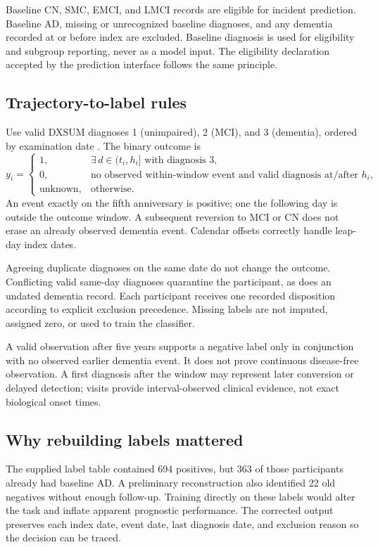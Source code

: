 \documentclass[11pt,a4paper]{article}
\begin{document}
Baseline CN, SMC, EMCI, and LMCI records are eligible for incident prediction. Baseline AD, missing or unrecognized baseline diagnoses, and any dementia recorded at or before index are excluded. Baseline diagnosis is used for eligibility and subgroup reporting, never as a model input. The eligibility declaration accepted by the prediction interface follows the same principle.
\subsection{Trajectory-to-label rules}
Use valid DXSUM diagnoses 1 (unimpaired), 2 (MCI), and 3 (dementia), ordered by examination date \cite{adni}. The binary outcome is
\begin{equation}
y_i=\begin{cases}
1, & \exists\,d\in(t_i,h_i]\text{ with diagnosis }3,\\
0, & \text{no observed within-window event and valid diagnosis at/after }h_i,\\
\mathrm{unknown}, & \text{otherwise.}
\end{cases}
\end{equation}
An event exactly on the fifth anniversary is positive; one the following day is outside the outcome window. A subsequent reversion to MCI or CN does not erase an already observed dementia event. Calendar offsets correctly handle leap-day index dates.

Agreeing duplicate diagnoses on the same date do not change the outcome. Conflicting valid same-day diagnoses quarantine the participant, as does an undated dementia record. Each participant receives one recorded disposition according to explicit exclusion precedence. Missing labels are not imputed, assigned zero, or used to train the classifier.

A valid observation after five years supports a negative label only in conjunction with no observed earlier dementia event. It does not prove continuous disease-free observation. A first diagnosis after the window may represent later conversion or delayed detection; visits provide interval-observed clinical evidence, not exact biological onset times.
\subsection{Why rebuilding labels mattered}
The supplied label table contained 694 positives, but 363 of those participants already had baseline AD. A preliminary reconstruction also identified 22 old negatives without enough follow-up. Training directly on these labels would alter the task and inflate apparent prognostic performance. The corrected output preserves each index date, event date, last diagnosis date, and exclusion reason so the decision can be traced.
\end{document}

